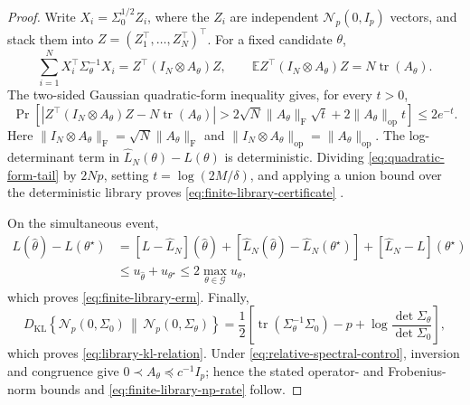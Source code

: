\documentclass[11pt]{article}
\theoremstyle{remark}
\newcommand{\E}{\mathbb E}
\newcommand{\tr}{\operatorname{tr}}
\newcommand{\KL}{D_{\mathrm{KL}}}
\newcommand{\Normal}{\mathcal N}
\begin{document}
\begin{proof}
Write \(X_i=\Sigma_0^{1/2}Z_i\), where the \(Z_i\) are independent
\(\Normal_p(0,I_p)\) vectors, and stack them into
\(Z=(Z_1^\top,\ldots,Z_N^\top)^\top\).  For a fixed candidate \(\theta\),
\begin{equation}
  \sum_{i=1}^N X_i^\top\Sigma_\theta^{-1}X_i
  =Z^\top(I_N\otimes A_\theta)Z,
  \qquad
  \E Z^\top(I_N\otimes A_\theta)Z=N\tr(A_\theta).
\end{equation}
The two-sided Gaussian quadratic-form inequality gives, for every \(t>0\),
\begin{equation}
  \Pr\left[
  \left|Z^\top(I_N\otimes A_\theta)Z-N\tr(A_\theta)\right|
  >2\sqrt N\lVert A_\theta\rVert_{\mathrm F}\sqrt t
   +2\lVert A_\theta\rVert_{\mathrm{op}}t
  \right]\leq2e^{-t}.
  \label{eq:quadratic-form-tail}
\end{equation}
Here
\(\lVert I_N\otimes A_\theta\rVert_{\mathrm F}
=\sqrt N\lVert A_\theta\rVert_{\mathrm F}\) and
\(\lVert I_N\otimes A_\theta\rVert_{\mathrm{op}}
=\lVert A_\theta\rVert_{\mathrm{op}}\).  The log-determinant term in
\(\widehat L_N(\theta)-L(\theta)\) is deterministic.  Dividing
\eqref{eq:quadratic-form-tail} by \(2Np\), setting
\(t=\log(2M/\delta)\), and applying a union bound over the deterministic
library proves \eqref{eq:finite-library-certificate}
\citep{laurent2000quadratic,hsu2012quadratic}.

On the simultaneous event,
\begin{align}
  L(\widehat\theta)-L(\theta^\star)
  &=[L-\widehat L_N](\widehat\theta)
    +[\widehat L_N(\widehat\theta)-\widehat L_N(\theta^\star)]
    +[\widehat L_N-L](\theta^\star)\nonumber\\
  &\leq u_{\widehat\theta}+u_{\theta^\star}
  \leq2\max_{\theta\in\mathcal G}u_\theta,
\end{align}
which proves \eqref{eq:finite-library-erm}.  Finally,
\begin{equation}
  \KL\!\left\{\Normal_p(0,\Sigma_0)\,\middle\|\,
  \Normal_p(0,\Sigma_\theta)\right\}
  =\frac12\left[
  \tr(\Sigma_\theta^{-1}\Sigma_0)-p
  +\log\frac{\det\Sigma_\theta}{\det\Sigma_0}
  \right],
\end{equation}
which proves \eqref{eq:library-kl-relation}.  Under
\eqref{eq:relative-spectral-control}, inversion and congruence give
\(0\prec A_\theta\preceq c^{-1}I_p\); hence the stated operator- and
Frobenius-norm bounds and \eqref{eq:finite-library-np-rate} follow.
\end{proof}
\end{document}
